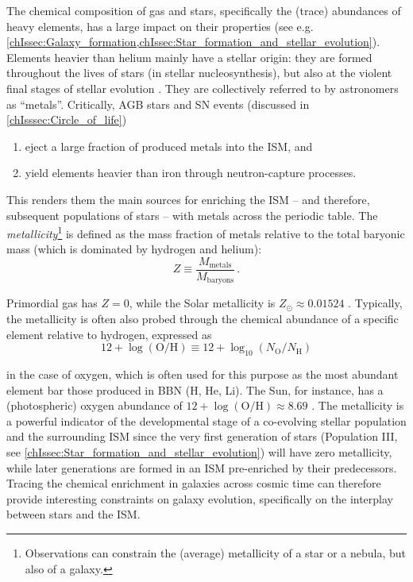 The chemical composition of gas and stars, specifically the (trace) abundances of heavy elements, has a large impact on their properties (see e.g. \cref{chIssec:Galaxy_formation,chIssec:Star_formation_and_stellar_evolution}). Elements heavier than helium mainly have a stellar origin: they are formed throughout the lives of stars (in stellar nucleosynthesis), but also at the violent final stages of stellar evolution . They are collectively referred to by astronomers as ``metals''. Critically, AGB stars and SN events (discussed in \cref{chIsssec:Circle_of_life})
\begin{enumerate}[label=(\roman*)]
    \item eject a large fraction of produced metals into the ISM, and
    \item yield elements heavier than iron through neutron-capture processes.
\end{enumerate}

This renders them the main sources for enriching the ISM -- and therefore, subsequent populations of stars -- with metals across the periodic table. The \textit{metallicity}\footnote{Observations can constrain the (average) metallicity of a star or a nebula, but also of a galaxy.} is defined as the mass fraction of metals relative to the total baryonic mass (which is dominated by hydrogen and helium):
\begin{equation}
    \label{chIeq:Metallicity}
    Z \equiv \frac{M_\text{metals}}{M_\text{baryons}} \, .
\end{equation}

Primordial gas has $Z = 0$, while the Solar metallicity is $Z_\odot \approx 0.01524$ \citep[][; note that a fiducial value of $Z_\odot = 0.02$ is often adopted, however]{2012MNRAS.427..127B}. Typically, the metallicity is often also probed through the chemical abundance of a specific element relative to hydrogen, expressed as
\begin{equation}
    \label{chIeq:Oxygen_abundance}
    12 + \log \left( \mathrm{O/H} \right) \equiv 12 + \log_{10} \left( N_\text{O}/N_\text{H} \right)
\end{equation}

\noindent in the case of oxygen, which is often used for this purpose as the most abundant element bar those produced in BBN (H, He, Li). The Sun, for instance, has a (photospheric) oxygen abundance of $12 + \log \left( \mathrm{O/H} \right) \approx 8.69$ \citep{2009ARA&A..47..481A}. The metallicity is a powerful indicator of the developmental stage of a co-evolving stellar population and the surrounding ISM since the very first generation of stars (Population III, see \cref{chIssec:Star_formation_and_stellar_evolution}) will have zero metallicity, while later generations are formed in an ISM pre-enriched by their predecessors. Tracing the chemical enrichment in galaxies across cosmic time can therefore provide interesting constraints on galaxy evolution, specifically on the interplay between stars and the ISM.

